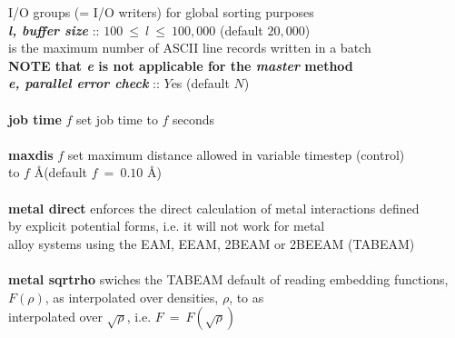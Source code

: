 \begin{tabbing}
\>                                              \> \phantom{xxxx} I/O groups (= I/O writers) for global sorting purposes \\
\>                                              \> {\bf \em l, buffer size} :: $100~\le~l~\le~100,000$ (default $20,000$) \\
\>                                              \> \phantom{x} is the maximum number of ASCII line records written in a batch \\
\>                                              \> {\bf NOTE that {\em e} is not applicable for the {\em master} method} \\
\>                                              \> \phantom{xxx} {\bf \em e, parallel error check} :: $Y$es (default $N$) \\
\>                                              \> \\
\> {\bf job time} $f$                           \> set job time to $f$ seconds \\
\>                                              \> \\
\> {\bf maxdis} $f$                             \> set maximum distance allowed in variable timestep (control) \\
\>                                              \> to $f$ \AA (default $f~=~0.10$ \AA) \\
\>                                              \> \\
\> {\bf metal direct}                           \> enforces the direct calculation of metal interactions defined \\
\>                                              \> by explicit potential forms, i.e. it will not work for metal \\
\>                                              \> alloy systems using the EAM, EEAM, 2BEAM or 2BEEAM (TABEAM) \\
\>                                              \> \\
\> {\bf metal sqrtrho}                          \> swiches the TABEAM default of reading embedding functions, \\
\>                                              \> $F(\rho)$, as interpolated over densities, $\rho$, to as \\
\>                                              \> interpolated over $\sqrt{\rho}$, i.e. $F~=~F(\sqrt{\rho})$\\
\>                                              \> \\

\end{tabbing}
